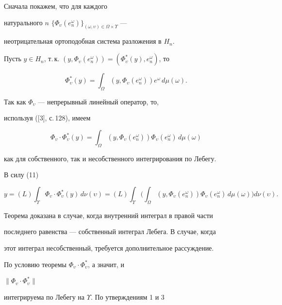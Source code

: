 \begin{pf}


Сначала покажем, что для каждого


натурального $n$\; $\{\Phi_\upsilon


(e^\omega_n)\}_{(\omega,\upsilon)\in\Omega\times\Upsilon}$ ---


неотрицательная ортоподобная система разложения в $H_n$.





Пусть $y\in H_n$, т.\,к. $(y,\Phi_\upsilon (e^\omega_n


))=(\Phi^*_\upsilon(y),e^\omega_n)$, то


$$


\Phi^*_\upsilon (y)=\int_\Omega (y,\Phi_\upsilon


(e^\omega_n))e^\omega\,d\mu(\omega).


$$


Так как $\Phi_\upsilon$ --- непрерывный линейный оператор, то,


используя ([3], с.\,128), имеем


$$


\Phi_\upsilon\cdot\Phi^*_\upsilon (y)=\int_\Omega(y,\Phi_\upsilon


(e^\omega_n))\Phi_\upsilon (e^\omega_n)\,d\mu(\omega)


$$


как для собственного, так и несобственного интегрирования по Лебегу.


В силу (11)


$$


y=(L)\int_\Upsilon \Phi_\upsilon\cdot\Phi^*_\upsilon (y)\,d\nu


(\upsilon)=(L)\int_\Upsilon \bigg(\int_\Omega(y,\Phi_\upsilon


(e^\omega_n))\Phi_\upsilon (e^\omega_n)\,d\mu(\omega)\bigg)d\nu


(\upsilon).


$$


Теорема доказана в случае, когда внутренний интеграл в правой части


последнего равенства --- собственный интеграл Лебега. В случае, когда


этот интеграл несобственный, требуется дополнительное рассуждение.


По условию теоремы $\Phi_\upsilon\cdot \Phi^*_\upsilon$, а значит, и


$\|\Phi_\upsilon \cdot \Phi^*_\upsilon\|$


интегрируема по Лебегу на $\Upsilon$. По утверждениям 1 и 3



\end{pf}
